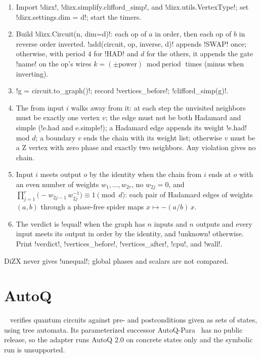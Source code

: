 \begin{algorithm}\label{alg:bench-tools-dizx}
\begin{enumerate}
\item Import \py!dizx!, \py!dizx.simplify.clifford_simp!, and \py!dizx.utils.VertexType!; set \py!dizx.settings.dim = d!; start the timers.
\item Build \py!dizx.Circuit(n, dim=d)!: each op of $a$ in order, then each op of $b$ in reverse order inverted. \py!add(circuit, op, inverse, d)! appends \code!SWAP! once; otherwise, with period $4$ for \code!HAD! and $d$ for the others, it appends the gate \code!name! on the op's wires $k=(\pm\text{power})\bmod\text{period}$ times (minus when inverting).
\item \py!g = circuit.to_graph()!; record \code!vertices_before!; \py!clifford_simp(g)!.
\item The  from input $i$ walks away from it: at each step the unvisited neighbors must be exactly one vertex $v$; the edge must not be both Hadamard and simple (\code!e.had and e.simple!); a Hadamard edge appends its weight \code!e.had! mod $d$; a boundary $v$ ends the chain with its weight list; otherwise $v$ must be a Z vertex with zero phase and exactly two neighbors. Any violation gives no chain.
\item Input $i$ meets output $o$ by the identity when the chain from $i$ ends at $o$ with an even number of weights $w_1,\ldots,w_{2r}$, no $w_{2j}=0$, and $\prod_{j=1}^{r}\bigl(-w_{2j-1}\,w_{2j}^{-1}\bigr)\equiv1\pmod d$: each pair of Hadamard edges of weights $(a,b)$ through a phase-free spider maps $x\mapsto-(a/b)\,x$.
\item The verdict is \code!equal! when the graph has $n$ inputs and $n$ outputs and every input meets its output in order by the identity, and \code!unknown! otherwise. Print \code!verdict!, \code!vertices_before!, \code!vertices_after!, \code!cpu!, and \code!wall!.
\end{enumerate}
\end{algorithm}

DiZX never gives \code!unequal!; global phases and scalars are not compared.

\section{AutoQ}\label{sec:bench-tools-autoq}

~\cite{chen2023autoq} verifies quantum circuits against pre- and postconditions given as sets of states, using tree automata. Its parameterized successor AutoQ-Para~\cite{abdulla2026parameterized} has no public release, so the adapter runs AutoQ 2.0 on concrete states only and the symbolic run is unsupported.

